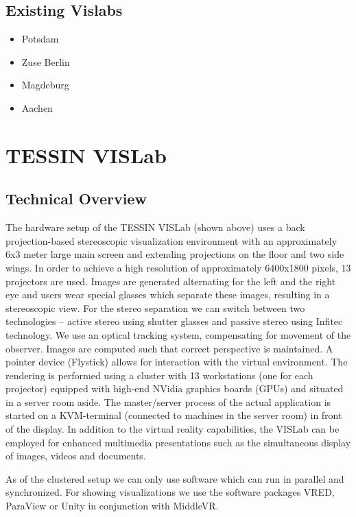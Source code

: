 \subsection{Existing Vislabs}
\label{existing-vislabs}

\begin{itemize}
\itemsep1pt\parskip0pt
\item
  Potsdam
\item
  Zuse Berlin
\item
  Magdeburg
\item
  Aachen
\end{itemize}

\section{TESSIN VISLab}
\label{tessin-vislab}

\subsection{Technical Overview}
\label{technical-overview}

The hardware setup of the TESSIN VISLab (shown above) uses a back
projection-based stereoscopic visualization environment with an
approximately 6x3 meter large main screen and extending projections
on the floor and two side wings. In order to achieve a high resolution
of approximately 6400x1800 pixels, 13 projectors are used.
Images are generated alternating for the left and the right eye
and users wear special glasses which separate these images, resulting in
a stereoscopic view. For the stereo separation we can switch
between two technologies -- active stereo using shutter glasses and
passive stereo using Infitec\cite{infitec} technology. We use an optical tracking
system, compensating for movement of the observer. Images are computed
such that correct perspective is maintained. A pointer device (Flystick) allows for
interaction with the virtual environment. The rendering is performed
using a cluster with 13 workstations (one for each projector) equipped
with high-end NVidia graphics boards (GPUs) and situated in a server
room aside. The master/server process of the actual application is
started on a KVM-terminal (connected to machines in the server room) in
front of the display. In addition to the virtual reality capabilities,
the VISLab can be employed for enhanced multimedia presentations such as
the simultaneous display of images, videos and documents.

As of the clustered setup we can only use software which can run in
parallel and synchronized. For showing visualizations we use the
software packages VRED, ParaView or Unity in conjunction with MiddleVR.

